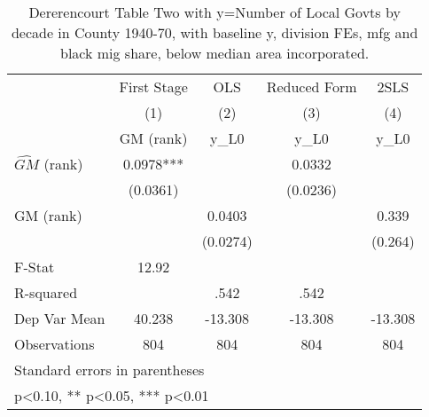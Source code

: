 \begin{table}[htbp]\centering
\def\sym#1{\ifmmode^{#1}\else\(^{#1}\)\fi}
\caption{Dererencourt Table Two with y=Number of Local Govts by decade in County 1940-70, with baseline y, division FEs, mfg and black mig share, below median area incorporated.}
\begin{tabular}{l*{4}{c}}
\toprule
                    & First Stage   &         OLS   &Reduced Form   &        2SLS   \\
                    &\multicolumn{1}{c}{(1)}&\multicolumn{1}{c}{(2)}&\multicolumn{1}{c}{(3)}&\multicolumn{1}{c}{(4)}\\
                    &\multicolumn{1}{c}{GM  (rank)}&\multicolumn{1}{c}{y\_L0}&\multicolumn{1}{c}{y\_L0}&\multicolumn{1}{c}{y\_L0}\\
\midrule
$\hat{GM}$ (rank)   &      0.0978***&               &      0.0332   &               \\
                    &    (0.0361)   &               &    (0.0236)   &               \\
\addlinespace
GM  (rank)          &               &      0.0403   &               &       0.339   \\
                    &               &    (0.0274)   &               &     (0.264)   \\
\midrule
F-Stat              &       12.92   &               &               &               \\
R-squared           &               &        .542   &        .542   &               \\
Dep Var Mean        &      40.238   &     -13.308   &     -13.308   &     -13.308   \\
Observations        &         804   &         804   &         804   &         804   \\
\bottomrule
\multicolumn{5}{l}{\footnotesize Standard errors in parentheses}\\
\multicolumn{5}{l}{\footnotesize * p<0.10, ** p<0.05, *** p<0.01}\\
\end{tabular}
\end{table}
